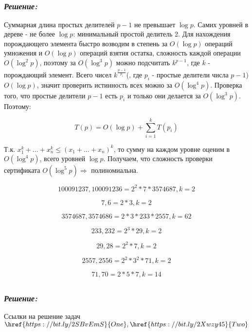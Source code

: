 \documentclass[a4paper, 12pt]{article}
\newcommand*\circled[1]{\tikz[baseline=(char.base)]{
            \node[shape=circle,draw,inner sep=2pt] (char) {#1};}}
\begin{document}
\subsection*{\circled{5}} 
\subsubsection*{\textit{Решение:}}

Суммарная длина простых делителей $p-1$ не превышает $\log{p}$. Самих уровней в дереве - не более $\log{p}$: минимальный простой делитель 2. Для нахождения порождающего элемента быстро возводим в степень за $O(\log{p})$ операций умножения и $O(\log{p})$ операций взятия остатка, сложность каждой операции $O(\log^2{p})$, поэтому за $O(\log^3{p})$ можно подсчитать $k^{p-1}$, где $k$ - порождающий элемент. Всего чисел $k^{\frac{p-1}{p_i}}$(, где $p_i$ - простые делители числа $p-1$) $O(\log{p})$, значит проверить истинность всех можно за $O(\log^4{p})$. Проверка того, что простые делители $p-1$ есть $p_i$ и только они делается за $O(\log^3{p})$. Поэтому:

\[T(p) = O(\log{p}) + \sum_{i=1}^k T(p_i)\]

Т.к. $x_1^k+\dots+x_n^k \leq (x_1 + \dots + x_n)^k$, то сумму на каждом уровне оценим в $O(\log^4{p})$, всего уровней $\log{p}$. Получаем, что сложность проверки сертификата $O(\log^5{p}) \Rightarrow$ полиномиальна.

\[100091237, 100091236 = 2^2 * 7 * 3574687, k = 2\]

\[7, 6 = 2 * 3, k = 2\]

\[3574687, 3574686 = 2 * 3 * 233 * 2557, k = 62\]

\[233, 232 = 2^3 * 29, k =2\]

\[29, 28 = 2^2 * 7, k = 2\]

\[2557, 2556 = 2^2 * 3^2 * 71, k = 2\]

\[71, 70 = 2 * 5 * 7, k = 14\]

\subsection*{\circled{6}} 
\subsubsection*{\textit{Решение:}}

Ссылки на решение задач $\href{https://bit.ly/2SBvEmS}{One}, \href{https://bit.ly/2Xwzy45}{Two}$

\subsection*{\circled{7}} 
\end{document}
